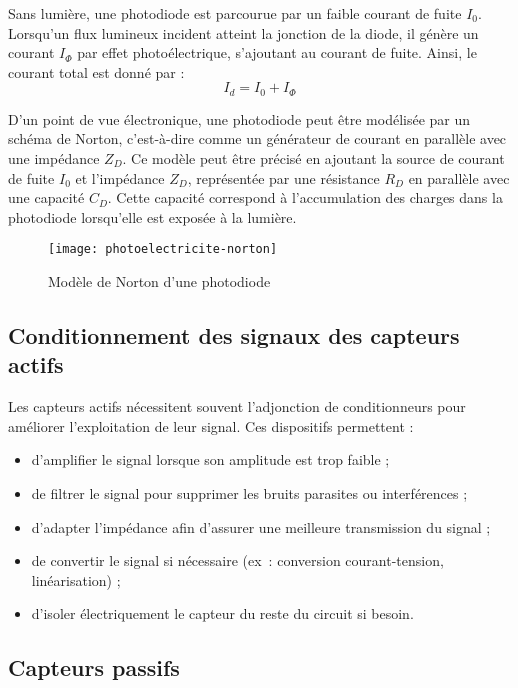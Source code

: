 Sans lumière, une photodiode est parcourue par un faible courant de fuite $I_0$. 
Lorsqu'un flux lumineux incident atteint la jonction de la diode, il génère un 
courant $I_\Phi$ par effet photoélectrique, s'ajoutant au courant de fuite. 
Ainsi, le courant total est donné par :
\[
I_d = I_0 + I_\Phi
\]

D'un point de vue électronique, une photodiode peut être modélisée par un schéma 
de Norton, c'est-à-dire comme un générateur de courant en parallèle avec une 
impédance $Z_D$. Ce modèle peut être précisé en ajoutant la source de courant de 
fuite $I_0$ et l'impédance $Z_D$, représentée par une résistance $R_D$ en 
parallèle avec une capacité $C_D$. Cette capacité correspond à l'accumulation 
des charges dans la photodiode lorsqu'elle est exposée à la lumière.

\begin{figure}[H]
    \centering
    \texttt{[image: photoelectricite-norton]}
    \caption{Modèle de Norton d'une photodiode}
    \label{figPhotodiodeNorton}
\end{figure}

\subsection{Conditionnement des signaux des capteurs actifs}
Les capteurs actifs nécessitent souvent l'adjonction de conditionneurs pour améliorer l'exploitation de leur signal. Ces dispositifs permettent :
\begin{itemize}
    \item d'amplifier le signal lorsque son amplitude est trop faible ;
    \item de filtrer le signal pour supprimer les bruits parasites ou interférences ;
    \item d'adapter l'impédance afin d'assurer une meilleure transmission du signal ;
    \item de convertir le signal si nécessaire (ex~: conversion courant-tension, linéarisation) ;
    \item d'isoler électriquement le capteur du reste du circuit si besoin.
\end{itemize}

\subsection{Capteurs passifs}

